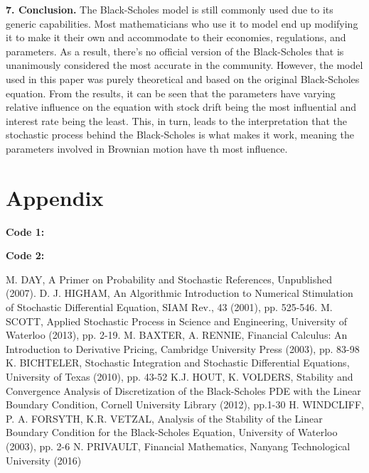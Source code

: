 \documentclass{report}
\begin{document}
	\textbf{7. Conclusion.} The Black-Scholes model is still commonly used due to its generic capabilities. Most mathematicians who use it to model end up modifying it to make it their own and accommodate to their economies, regulations, and parameters. As a result, there's no official version of the Black-Scholes that is unanimously considered the most accurate in the community. However, the model used in this paper was purely theoretical and based on the original Black-Scholes equation. From the results, it can be seen that the parameters have varying relative influence on the equation with stock drift being the most influential and interest rate being the least. This, in turn, leads to the interpretation that the stochastic process behind the Black-Scholes is what makes it work, meaning the parameters involved in Brownian motion have th most influence.
	\newpage
	\section*{Appendix}
	\textbf{Code 1:}
	
	\textbf{Code 2:}
	
	\begin{thebibliography}{20}
		M. DAY, 
		A Primer on Probability and Stochastic References, 
		Unpublished (2007).
		D. J. HIGHAM, 
		An Algorithmic Introduction to Numerical Stimulation of Stochastic Differential Equation, 
		SIAM Rev., 43 (2001), 
		pp. 525-546.
		M. SCOTT, 
		Applied Stochastic Process in Science and Engineering, 
		University of Waterloo (2013), 
		pp. 2-19.
		M. BAXTER, A. RENNIE, 
		Financial Calculus: An Introduction to Derivative Pricing, 
		Cambridge University Press (2003), 
		pp. 83-98
		K. BICHTELER, 
		Stochastic Integration and Stochastic Differential Equations,
		University of Texas (2010),
		pp. 43-52
		K.J. HOUT, K. VOLDERS, 
		Stability and Convergence Analysis of Discretization of the Black-Scholes PDE with the Linear Boundary Condition, 
		Cornell University Library (2012), 
		pp.1-30
		H. WINDCLIFF, P. A. FORSYTH, K.R. VETZAL, 
		Analysis of the Stability of the Linear Boundary Condition for the Black-Scholes Equation, 
		University of Waterloo (2003), 
		pp. 2-6
		N. PRIVAULT,
		Financial Mathematics,
		Nanyang Technological University (2016)
	\end{thebibliography}
\end{document}

